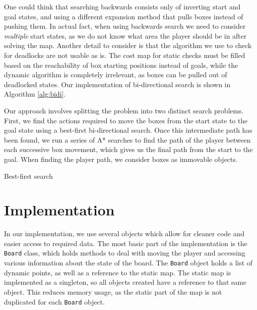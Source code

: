 \documentclass[a4paper,11pt]{article}
\begin{document}
One could think that searching backwards consists only of inverting start and
goal states, and using a different expansion method that pulls boxes instead of
pushing them. In actual fact, when using backwards search we need to consider
\emph{multiple} start states, as we do not know what area the player should be
in after solving the map. Another detail to consider is that the algorithm we
use to check for deadlocks are not usable as is. The cost map for static checks
must be filled based on the reachability of box starting positions instead of
goals, while the dynamic algorithm is completely irrelevant, as boxes can be
pulled out of deadlocked states. Our implementation of bi-directional search is
shown in Algorithm \ref{alg:bidi}.

Our approach involves splitting the problem into two distinct search
problems. First, we find the actions required to move the boxes from the start
state to the goal state using a best-first bi-directional search. Once this
intermediate path has been found, we run a series of A* searches to find the
path of the player between each successive box movement, which gives us the
final path from the start to the goal. When finding the player path, we consider
boxes as immovable objects.


\begin{algorithm}
  \DontPrintSemicolon
\caption{Best-first search}
\label{alg:bestfirst}
\end{algorithm}

\section{Implementation}
In our implementation, we use several objects which allow for cleaner code and
easier access to required data. The most basic part of the implementation is the
\texttt{Board} class, which holds methods to deal with moving the player and
accessing various information about the state of the board. The \texttt{Board}
object holds a list of dynamic points, as well as a reference to the static
map. The static map is implemented as a singleton, so all objects created have a
reference to that same object. This reduces memory usage, as the static part of
the map is not duplicated for each \texttt{Board} object.
\end{document}
